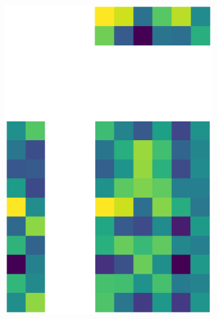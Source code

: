 \documentclass[10pt,twocolumn]{article}
\begin{document}
\begin{figure}[H]
\begin{subfigure}[t]{.15\textwidth}
\centering
\includegraphics[scale=.2]{DWGs/random-matrix-reconstruction-PCs-2.eps}
\caption{ }
\end{subfigure}
\begin{subfigure}[t]{.15\textwidth}
\centering

\end{subfigure}
\end{figure}
\end{document}
